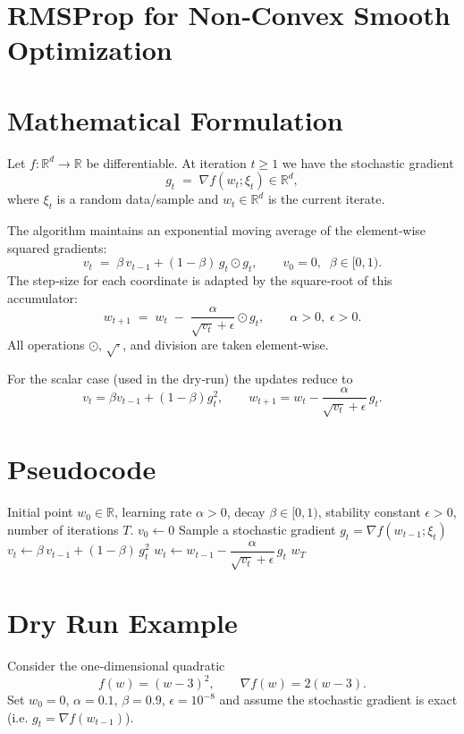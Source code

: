 \documentclass{article}
\newcommand{\RR}{\mathbb{R}}
\begin{document}
\section*{RMSProp for Non‑Convex Smooth Optimization}

\section*{Mathematical Formulation}
Let $f:\RR^{d}\rightarrow\RR$ be differentiable.  
At iteration $t\ge 1$ we have the stochastic gradient
\[
g_{t}\;=\;\nabla f(w_{t};\xi_{t})\in\RR^{d},
\]
where $\xi_{t}$ is a random data/sample and $w_{t}\in\RR^{d}$ is the current iterate.  

The algorithm maintains an exponential moving average of the element‑wise squared gradients:
\[
\boxed{v_{t}\;=\;\beta\,v_{t-1}+(1-\beta)\,g_{t}\odot g_{t}},\qquad v_{0}=0,\;\; \beta\in[0,1).
\]
The step‑size for each coordinate is adapted by the square‑root of this accumulator:
\[
\boxed{w_{t+1}\;=\;w_{t}\;-\;\frac{\alpha}{\sqrt{v_{t}}+\epsilon}\odot g_{t}},\qquad 
\alpha>0,\;\epsilon>0.
\]
All operations $\odot$, $\sqrt{\cdot}$, and division are taken element‑wise.

For the scalar case (used in the dry‑run) the updates reduce to  
\[
v_{t}= \beta v_{t-1}+(1-\beta)g_{t}^{2},\qquad 
w_{t+1}= w_{t}-\frac{\alpha}{\sqrt{v_{t}}+\epsilon}\,g_{t}.
\]

\section*{Pseudocode}
\begin{algorithm}[H]
\caption{RMSProp (scalar version for clarity)}
\begin{algorithmic}[1]
\REQUIRE Initial point $w_{0}\in\RR$, learning rate $\alpha>0$, decay $\beta\in[0,1)$, 
stability constant $\epsilon>0$, number of iterations $T$.
\STATE $v_{0}\leftarrow 0$
    \STATE Sample a stochastic gradient $g_{t}= \nabla f(w_{t-1};\xi_{t})$
    \STATE $v_{t}\leftarrow \beta\,v_{t-1}+(1-\beta)\,g_{t}^{2}$ 
    \STATE $w_{t}\leftarrow w_{t-1}-\dfrac{\alpha}{\sqrt{v_{t}}+\epsilon}\,g_{t}$ 
\ENDFOR
\RETURN $w_{T}$
\end{algorithmic}
\end{algorithm}

\section*{Dry Run Example}
Consider the one‑dimensional quadratic
\[
f(w)= (w-3)^{2},\qquad \nabla f(w)=2(w-3).
\]
Set $w_{0}=0$, $\alpha=0.1$, $\beta=0.9$, $\epsilon=10^{-8}$ and assume the stochastic gradient is exact (i.e. $g_{t}=\nabla f(w_{t-1})$).
\end{document}
